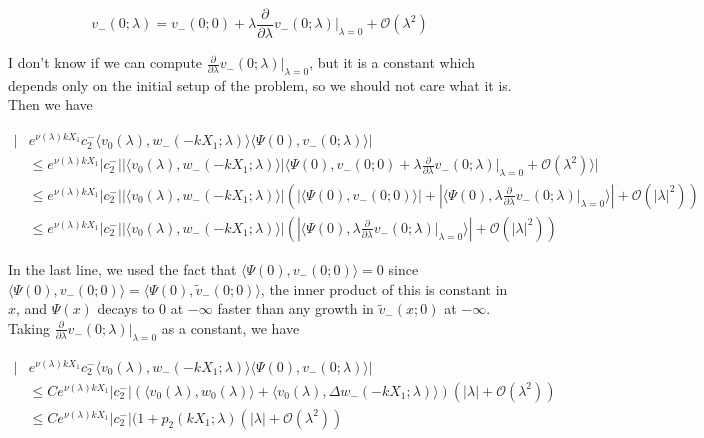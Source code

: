 \documentclass[12pt]{article}
\begin{document}
\begin{enumerate}
\[
v_-(0; \lambda) = v_-(0; 0) + \lambda \frac{\partial}{\partial \lambda}v_-(0; \lambda)\Big|_{\lambda = 0} + \mathcal{O}(\lambda^2)
\]

I don't know if we can compute $\frac{\partial}{\partial \lambda}v_-(0; \lambda)\Big|_{\lambda = 0}$, but it is a constant which depends only on the initial setup of the problem, so we should not care what it is. Then we have

\begin{align*}
|&e^{\nu(\lambda)k X_1} c_2^- \langle v_0(\lambda), w_-(-k X_1; \lambda) \rangle \langle \Psi(0), v_-(0; \lambda) \rangle|\\
&\leq e^{\nu(\lambda)k X_1}|c_2^-| |\langle v_0(\lambda), w_-(-k X_1; \lambda) \rangle|\langle \Psi(0), v_-(0; 0) + \lambda \frac{\partial}{\partial \lambda}v_-(0; \lambda)\Big|_{\lambda = 0} + \mathcal{O}(\lambda^2) \rangle| \\
&\leq e^{\nu(\lambda)k X_1}|c_2^-| |\langle v_0(\lambda), w_-(-k X_1; \lambda) \rangle| \left( |\langle \Psi(0), v_-(0; 0) \rangle| +  |\langle \Psi(0), \lambda \frac{\partial}{\partial \lambda}v_-(0; \lambda)\Big|_{\lambda = 0} \rangle| + \mathcal{O}(|\lambda|^2) \right) \\
&\leq e^{\nu(\lambda)k X_1}|c_2^-| |\langle v_0(\lambda), w_-(-k X_1; \lambda) \rangle| \left( |\langle \Psi(0), \lambda \frac{\partial}{\partial \lambda}v_-(0; \lambda)\Big|_{\lambda = 0} \rangle| + \mathcal{O}(|\lambda|^2) \right)
\end{align*}

In the last line, we used the fact that $\langle \Psi(0), v_-(0; 0) \rangle = 0$ since $\langle \Psi(0), v_-(0; 0) \rangle = \langle \Psi(0), \tilde{v}_-(0; 0) \rangle$, the inner product of this is constant in $x$, and $\Psi(x)$ decays to 0 at $-\infty$ faster than any growth in $\tilde{v}_-(x; 0)$ at $-\infty$. Taking $\frac{\partial}{\partial \lambda}v_-(0; \lambda)\Big|_{\lambda = 0}$ as a constant, we have

\begin{align*}
|&e^{\nu(\lambda)k X_1} c_2^- \langle v_0(\lambda), w_-(-k X_1; \lambda) \rangle \langle \Psi(0), v_-(0; \lambda) \rangle| \\
&\leq C e^{\nu(\lambda)k X_1}|c_2^-| (\langle v_0(\lambda), w_0(\lambda) \rangle + \langle v_0(\lambda), \Delta w_-(-k X_1; \lambda) \rangle) (|\lambda| + \mathcal{O}(\lambda^2) ) \\
&\leq C e^{\nu(\lambda)k X_1}|c_2^-| (1 + p_2(k X_1; \lambda) (|\lambda| + \mathcal{O}(\lambda^2) )
\end{align*}


\end{enumerate}
\end{document}
